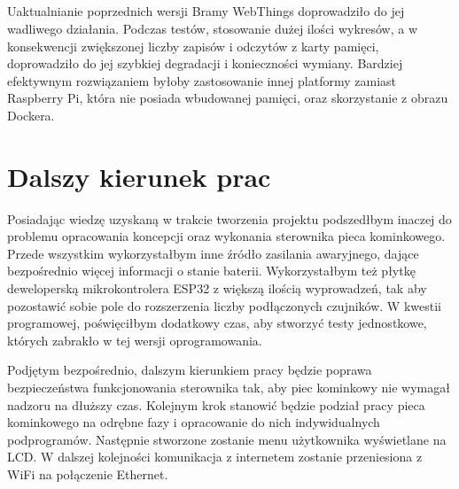 \documentclass[11pt]{report}
\begin{document}
\section{}
Uaktualnianie poprzednich wersji Bramy WebThings doprowadziło do jej wadliwego działania.
Podczas testów, stosowanie dużej ilości wykresów, a w konsekwencji zwiększonej liczby zapisów i odczytów z karty pamięci, doprowadziło do jej szybkiej degradacji i konieczności wymiany.
Bardziej efektywnym rozwiązaniem byłoby zastosowanie innej platformy zamiast Raspberry Pi, która nie posiada wbudowanej pamięci, oraz skorzystanie z obrazu Dockera.
 
 \chapter{Dalszy kierunek prac}
Posiadając wiedzę uzyskaną w trakcie tworzenia projektu podszedłbym inaczej do problemu opracowania koncepcji oraz wykonania sterownika pieca kominkowego. Przede wszystkim wykorzystałbym inne źródło zasilania awaryjnego, dające bezpośrednio więcej informacji o stanie baterii. Wykorzystałbym też płytkę deweloperską mikrokontrolera ESP32 z większą ilością wyprowadzeń, tak aby pozostawić sobie pole do rozszerzenia liczby podłączonych czujników. W kwestii programowej, poświęciłbym dodatkowy czas, aby stworzyć testy jednostkowe, których zabrakło w tej wersji oprogramowania.

Podjętym bezpośrednio, dalszym kierunkiem pracy będzie poprawa bezpieczeństwa funkcjonowania sterownika tak, aby piec kominkowy nie wymagał nadzoru na dłuższy czas.
Kolejnym krok stanowić będzie podział pracy pieca kominkowego na odrębne fazy i opracowanie do nich indywidualnych podprogramów. Następnie stworzone zostanie menu użytkownika wyświetlane na LCD.
W dalszej kolejności komunikacja z internetem zostanie przeniesiona z WiFi na połączenie Ethernet.



 
 \newpage
 \printbibliography[title={Książki},type=book]
 
 \printbibliography[title={Artykuły},type=article]
 
 \printbibliography[title={Prace dyplomowe}, type=thesis]
 
 \printbibliography[title={Materiały konferencyjne},type=inproceedings]
 
 \printbibliography[title={Pozostałe źródła}, nottype=article, nottype=book, nottype=inproceedings, nottype=thesis]

 
\end{document}
